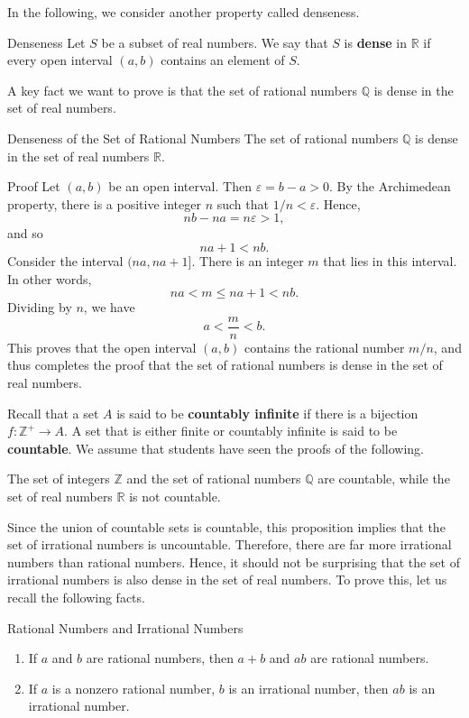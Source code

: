  In the following, we consider another property called denseness.
\begin{definition}{Denseness}
Let $S$ be a subset of real numbers. We say that $S$ is {\bf dense} in $\mathbb{R}$ if every open interval $(a, b)$ contains an element of $S$.
\end{definition}

A key fact we want to prove is that the set of rational numbers $\mathbb{Q}$ is dense in the set of real numbers. 

\begin{theorem}{Denseness of the Set of Rational Numbers}
The set of rational numbers $\mathbb{Q}$ is dense in the set of real numbers $\mathbb{R}$.

\end{theorem}
\begin{myproof}{Proof}
Let $(a, b)$ be an open interval. Then $\varepsilon=b-a>0$. By the Archimedean property, there is a positive integer $n$ such that
 $1/n <\varepsilon$.  Hence, \[nb-na=n\varepsilon>1,\]and so
\[ na+1<nb.\]
Consider the interval $(na, na+1]$. There is an integer $m$ that lies in this interval. In other words,
\[na<m\leq na+1<nb.\]
Dividing by $n$, we have
\[a<\frac{m}{n}<b.\]
This proves that the open interval $(a,b)$ contains the rational number $m/n$, and thus completes the proof that the set of rational numbers is dense in the set of real numbers.
\end{myproof}

Recall that a set $A$ is said to be   {\bf countably infinite} if there is a bijection $f:  \mathbb{Z}^+\to A$. A set that is either finite or countably infinite is said to be {\bf countable}.  We assume that students have seen the proofs of the following.


\begin{proposition}{}
The set of integers $\mathbb{Z}$ and the set of rational numbers $\mathbb{Q}$ are countable, while the set of real numbers $\mathbb{R}$ is not countable.
\end{proposition}

Since the union of countable sets is  countable, this proposition implies that the set of irrational numbers is uncountable. Therefore, there are far more irrational numbers than rational numbers. Hence, it should not be surprising that the set of irrational numbers is also dense in the set of real numbers. To prove this, 
let us recall the following facts.
\begin{highlight}{Rational Numbers and Irrational Numbers}
\begin{enumerate}[1.]
\item
If $a$ and $b$ are rational numbers, then $a+b$ and $ab$ are rational numbers.
\item If $a$ is a nonzero rational number, $b$ is an irrational number, then $ab$ is an irrational number.
\end{enumerate}
\end{highlight}

